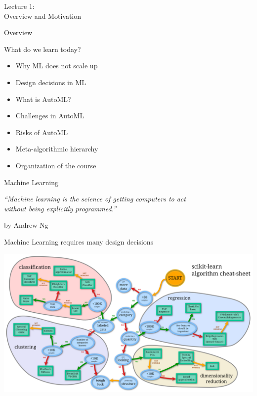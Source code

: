 \begin{frame}[c]{}

\centering
\huge
Lecture 1:\\
Overview and Motivation
\end{frame}
\begin{frame}[c]{Overview}

What do we learn today?

\begin{itemize}
  \item Why ML does not scale up
  \item Design decisions in ML 
  \item What is AutoML? 
  \item Challenges in AutoML
  \item Risks of AutoML
  \item Meta-algorithmic hierarchy 
  \item Organization of the course
\end{itemize}

\end{frame}
\begin{frame}[c]{Machine Learning}

\centering
\textit{``Machine learning is the science of getting computers to act\\
 without being explicitly programmed.''}

\hfill by Andrew Ng

\end{frame}
\begin{frame}[c]{Machine Learning requires many design decisions}

\includegraphics[width=1.0\textwidth]{images/sklearn-cheat}

\end{frame}
